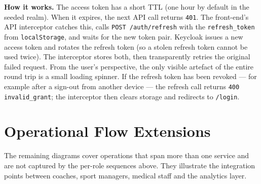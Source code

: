 \documentclass[12pt,a4paper,oneside]{report}
\begin{document}
\textbf{How it works.} The access token has a short TTL (one hour by
default in the seeded realm). When it expires, the next API call
returns \texttt{401}. The front-end's API interceptor catches this,
calls \texttt{POST /auth/refresh} with the \texttt{refresh\_token}
from \texttt{localStorage}, and waits for the new token pair. Keycloak
issues a new access token and rotates the refresh token (so a stolen
refresh token cannot be used twice). The interceptor stores both,
then transparently retries the original failed request. From the
user's perspective, the only visible artefact of the entire round
trip is a small loading spinner. If the refresh token has been
revoked --- for example after a sign-out from another device --- the
refresh call returns \texttt{400 invalid\_grant}; the interceptor
then clears storage and redirects to \texttt{/login}.

\section{Operational Flow Extensions}
\label{sec:seq-extensions}

The remaining diagrams cover operations that span more than one
service and are not captured by the per-role sequences above. They
illustrate the integration points between coaches, sport managers,
medical staff and the analytics layer.
\end{document}

